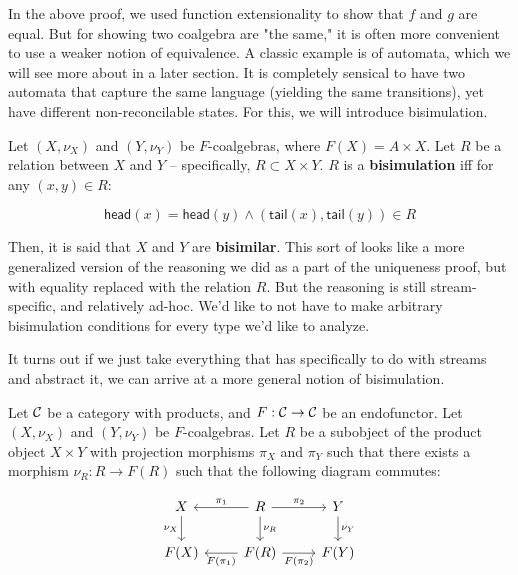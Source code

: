 In the above proof, we used function extensionality to show that $f$ and $g$ are equal.
But for showing two coalgebra are "the same," it is often more convenient to use a weaker notion of equivalence.
A classic example is of automata, which we will see more about in a later section.
It is completely sensical to have two automata that capture the same language (yielding the same transitions), yet have different non-reconcilable states.
For this, we will introduce bisimulation.

\begin{definition}
    
\label{def:bisimulationOfStreams}
  Let $(X, \nu_X)$ and $(Y, \nu_Y)$ be $F$-coalgebras, where $F(X) = A \times X$.
  Let $R$ be a relation between $X$ and $Y$ -- specifically, $R \subset X \times Y$.
  $R$ is a \textbf{bisimulation} iff for any $(x, y) \in R$:

  \begin{equation}
    \mathsf{head}(x) = \mathsf{head}(y) \wedge (\mathsf{tail}(x), \mathsf{tail}(y)) \in R
  \end{equation}
\end{definition}

Then, it is said that $X$ and $Y$ are \textbf{bisimilar}.
This sort of looks like a more generalized version of the reasoning we did as a part of the uniqueness proof, but with equality replaced with the relation $R$.
But the reasoning is still stream-specific, and relatively ad-hoc.
We'd like to not have to make arbitrary bisimulation conditions for every type we'd like to analyze.

It turns out if we just take everything that has specifically to do with streams and abstract it, we can arrive at a more general notion of bisimulation.


\begin{definition}
  Let $\mathcal C$ be a category with products, and $F : \mathcal C \rightarrow \mathcal C$ be an endofunctor.
  Let $(X, \nu_X)$ and $(Y, \nu_Y)$ be $F$-coalgebras.
  Let $R$ be a subobject of the product object $X \times Y$ with projection morphisms $\pi_X$ and $\pi_Y$ such that there exists a morphism $\nu_R : R \rightarrow F(R)$ such that the following diagram commutes:

    \[\begin{tikzcd}
        X & R & Y \\
        {F(X)} & {F(R)} & {F(Y)}
        \arrow["{\nu_X}"', from=1-1, to=2-1]
        \arrow["{\pi_1}"', from=1-2, to=1-1]
        \arrow["{\pi_2}", from=1-2, to=1-3]
        \arrow["{\nu_R}", from=1-2, to=2-2]
        \arrow["{\nu_Y}", from=1-3, to=2-3]
        \arrow["{F(\pi_1)}", from=2-2, to=2-1]
        \arrow["{F(\pi_2)}"', from=2-2, to=2-3]
    \end{tikzcd}\]
\end{definition}

